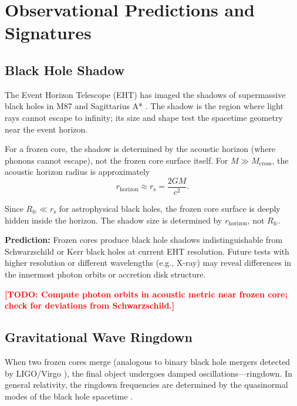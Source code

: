 \documentclass[12pt,a4paper]{article}
\newcommand{\TODO}[1]{\textcolor{red}{\textbf{[TODO: #1]}}}
\newcommand{\Rfc}{R_\text{fc}}
\newcommand{\Mcross}{M_\text{cross}}
\theoremstyle{definition}
\begin{document}
\section{Observational Predictions and Signatures}
\label{sec:observations}

\subsection{Black Hole Shadow}
\label{subsec:black_hole_shadow}

The Event Horizon Telescope (EHT) has imaged the shadows of supermassive black holes in M87 \cite{EHT2019} and Sagittarius A* \cite{EHT2022SgrA}. The shadow is the region where light rays cannot escape to infinity; its size and shape test the spacetime geometry near the event horizon.

For a frozen core, the shadow is determined by the acoustic horizon (where phonons cannot escape), not the frozen core surface itself. For $M \gg \Mcross$, the acoustic horizon radius is approximately
\begin{equation}
r_\text{horizon} \approx r_\text{s} = \frac{2GM}{c^2}.
\label{eq:r_horizon_shadow}
\end{equation}

Since $\Rfc \ll r_\text{s}$ for astrophysical black holes, the frozen core surface is deeply hidden inside the horizon. The shadow size is determined by $r_\text{horizon}$, not $\Rfc$.

\textbf{Prediction:} Frozen cores produce black hole shadows indistinguishable from Schwarzschild or Kerr black holes at current EHT resolution. Future tests with higher resolution or different wavelengths (e.g., X-ray) may reveal differences in the innermost photon orbits or accretion disk structure.

\TODO{Compute photon orbits in acoustic metric near frozen core; check for deviations from Schwarzschild.}

\subsection{Gravitational Wave Ringdown}
\label{subsec:ringdown}

When two frozen cores merge (analogous to binary black hole mergers detected by LIGO/Virgo \cite{LIGO2016,LIGO2019}), the final object undergoes damped oscillations—ringdown. In general relativity, the ringdown frequencies are determined by the quasinormal modes of the black hole spacetime \cite{Berti2009}.
\end{document}
